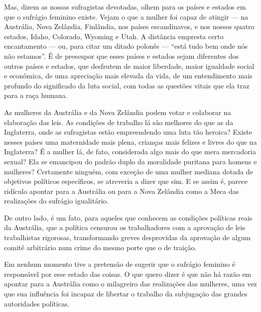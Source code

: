 Mas, dizem as nossas sufragistas devotadas, olhem para os países e
estados em que o sufrágio feminino existe. Vejam o que a mulher foi
capaz de atingir --- na Austrália, Nova Zelândia, Finlândia, nos países
escandinavos, e nos nossos quatro estados, Idaho, Colorado, Wyoming e
Utah. A distância empresta certo encantamento --- ou, para citar um
ditado polonês --- ``está tudo bem onde nós não estamos''. É de
pressupor que esses países e estados sejam diferentes dos outros países e estados, que desfrutem de maior liberdade, maior igualdade social e
econômica, de uma apreciação mais elevada da vida, de um entendimento
mais profundo do significado da luta social, com todas as questões
vitais que ela traz para a raça humana.

As mulheres da Austrália e da Nova Zelândia podem votar e colaborar na
elaboração das leis. As condições de trabalho lá são melhores do que as
da Inglaterra, onde as sufragistas estão empreendendo uma luta tão
heroica? Existe nesses países uma maternidade mais plena, crianças mais
felizes e livres do que na Inglaterra? É a mulher lá, de fato,
considerada algo mais do que mera mercadoria sexual? Ela se emancipou do
padrão duplo da moralidade puritana para homens e mulheres? Certamente
ninguém, com exceção de uma mulher mediana dotada de objetivos políticos
específicos, se atreveria a dizer que sim. E se assim é, parece ridículo
apontar para a Austrália ou para a Nova Zelândia como a Meca das
realizações do sufrágio igualitário.

De outro lado, é um fato, para aqueles que conhecem as condições
políticas reais da Austrália, que a política censurou os trabalhadores
com a aprovação de leis trabalhistas rigorosas, transformando greves
desprovidas da aprovação de algum comitê arbitrário num crime do mesmo
porte que o de traição.

Em nenhum momento tive a pretensão de sugerir que o sufrágio feminino é
responsável por esse estado das coisas. O que quero dizer é que não há
razão em apontar para a Austrália como o milagreiro das realizações das
mulheres, uma vez que sua influência foi incapaz de libertar o
trabalho da subjugação das grandes autoridades políticas.

